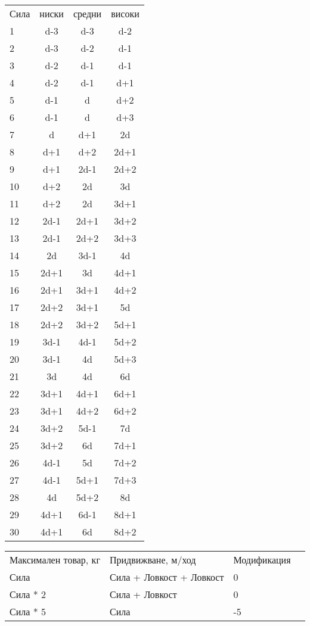 \documentclass{article}
\begin{document}
\begin{multicols}{2}
\begin{footnotesize}
\extrarowsep=0cm
\begin{tabular}{l | c | c | c}
Сила    & ниски & средни & високи  \\
1  & d-3  & d-3  & d-2   \\
2  & d-3  & d-2  & d-1   \\
3  & d-2  & d-1  & d-1   \\
4  & d-2  & d-1  & d+1   \\
5  & d-1  & d    & d+2   \\
6  & d-1  & d    & d+3   \\
7  & d    & d+1  & 2d    \\
8  & d+1  & d+2  & 2d+1  \\
9  & d+1  & 2d-1 & 2d+2  \\
10 & d+2  & 2d   & 3d    \\
11 & d+2  & 2d   & 3d+1  \\
12 & 2d-1 & 2d+1 & 3d+2  \\
13 & 2d-1 & 2d+2 & 3d+3  \\
14 & 2d   & 3d-1 & 4d    \\
15 & 2d+1 & 3d   & 4d+1  \\
16 & 2d+1 & 3d+1 & 4d+2  \\
17 & 2d+2 & 3d+1 & 5d    \\
18 & 2d+2 & 3d+2 & 5d+1  \\
19 & 3d-1 & 4d-1 & 5d+2  \\
20 & 3d-1 & 4d   & 5d+3  \\
21 & 3d   & 4d   & 6d    \\
22 & 3d+1 & 4d+1 & 6d+1  \\
23 & 3d+1 & 4d+2 & 6d+2  \\
24 & 3d+2 & 5d-1 & 7d    \\
25 & 3d+2 & 6d   & 7d+1  \\
26 & 4d-1 & 5d   & 7d+2  \\
27 & 4d-1 & 5d+1 & 7d+3  \\
28 & 4d   & 5d+2 & 8d    \\
29 & 4d+1 & 6d-1 & 8d+1  \\
30 & 4d+1 & 6d   & 8d+2
\end{tabular}

\begin{tabular}{l | l | l | l }
Максимален товар, кг & Придвижване, м/ход       & Модификация  \\
Сила                 & Сила + Ловкост + Ловкост & 0            \\
Сила * 2             & Сила + Ловкост           & 0            \\
Сила * 5             & Сила                     & -5
\end{tabular}
\end{footnotesize}
\end{multicols}
\end{document}
